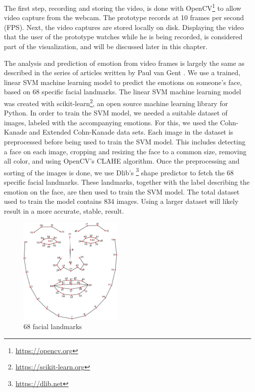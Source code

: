 \documentclass[sigconf]{acmart}
\begin{document}
The first step, recording and storing the video, is done with OpenCV\footnote{\url{https://opencv.org}}
to allow video capture from the webcam. The prototype records at 10 frames per second (FPS).
Next, the video captures are stored locally on disk.
Displaying the video that the user of the prototype watches while he is being recorded, is considered part of
the visualization, and will be discussed later in this chapter.

The analysis and prediction of emotion from video frames is largely the same as described in the series of
articles written by Paul van Gent \cite{gent2016landmarks}. We use a trained, linear SVM machine learning model
to predict the emotions on someone's face, based on 68 specific facial landmarks. The linear SVM machine learning
model was created with scikit-learn\footnote{\url{https://scikit-learn.org}}, an open source machine learning library
for Python. In order to train the SVM model, we needed a suitable dataset of images, labeled with the
accompanying emotions. For this, we used the Cohn-Kanade and Extended Cohn-Kanade
\cite{kanade2000comprehensive, lucey2010extended} data sets.
Each image in the dataset is preprocessed before being used to train the SVM model. This includes detecting
a face on each image, cropping and resizing the face to a common size, removing all color, and using OpenCV's
CLAHE algorithm. Once the preprocessing and sorting of the images is done, we use Dlib's
\footnote{\url{https://dlib.net}} shape predictor to fetch the 68 specific facial landmarks. These landmarks,
together with the label describing the emotion on the face, are then used to train the SVM model. The total
dataset used to train the model contains 834 images. Using a larger dataset will likely result in a more accurate,
stable, result.

\begin{figure}[h]
    \centering
    \includegraphics[width=0.45\textwidth, scale=1]{landmarks.png}
    \caption{68 facial landmarks}
\end{figure}
\end{document}
